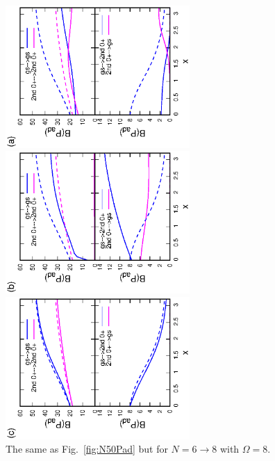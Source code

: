 \documentclass[11pt]{book} %
\begin{document}
\begin{figure}[t]
 \begin{minipage}{0.3\hsize}
 \begin{center}
  \includegraphics[width=70mm,angle=-90]{images/N8Pad_CQ.eps}
 \end{center}
 \captionsetup{labelformat=empty,labelsep=none}
 \end{minipage}
 \begin{minipage}{0.3\hsize}
 \begin{center}
  \includegraphics[width=70mm,angle=-90]{images/N8Pad_FD.eps}
 \end{center}
 \captionsetup{labelformat=empty,labelsep=none}
 \end{minipage}
 \begin{minipage}{0.3\hsize}
 \begin{center}
  \includegraphics[width=70mm,angle=-90]{images/N8Pad_SPA.eps}
 \end{center}
 \captionsetup{labelformat=empty,labelsep=none}
 \end{minipage}
	\caption{The same as Fig.~\ref{fig:N50Pad} but for $N=6\rightarrow 8$
	with $\Omega=8$.
}
 \label{fig:N8Pad}
\end{figure}
\end{document}
